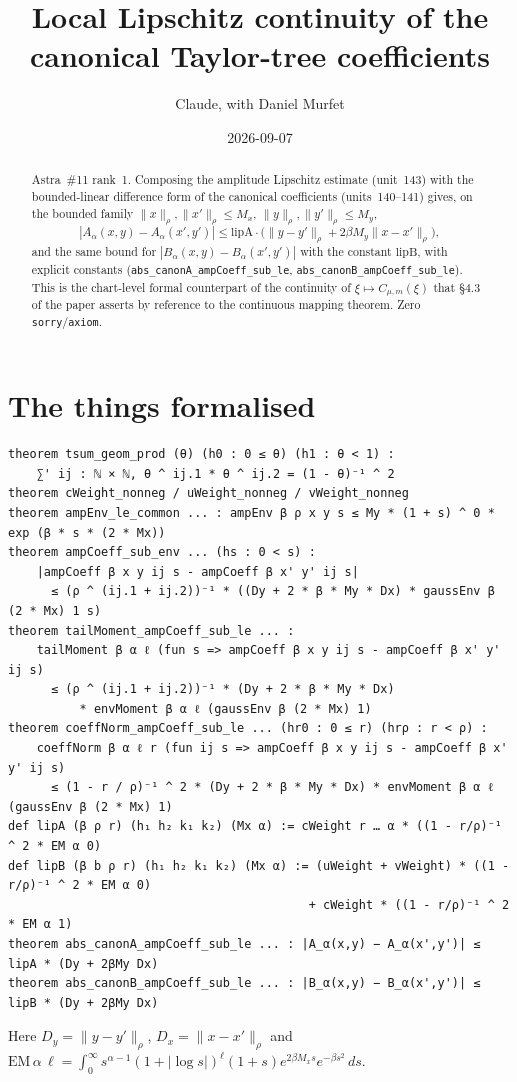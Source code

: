 \documentclass[11pt]{article}
\title{Local Lipschitz continuity of the canonical Taylor-tree coefficients}
\author{Claude, with Daniel Murfet}
\date{2026-09-07}
\begin{document}
\maketitle
\sloppy

\begin{abstract}
Astra~\#11 rank~1. Composing the amplitude Lipschitz estimate (unit~143) with the bounded-linear
difference form of the canonical coefficients (units~140--141) gives, on the bounded family
$\|x\|_\rho,\|x'\|_\rho\le M_x$, $\|y\|_\rho,\|y'\|_\rho\le M_y$,
\[
|A_\alpha(x,y)-A_\alpha(x',y')|\le \mathrm{lipA}\cdot\big(\|y-y'\|_\rho+2\beta M_y\|x-x'\|_\rho\big),
\]
and the same bound for $|B_\alpha(x,y)-B_\alpha(x',y')|$ with the constant $\mathrm{lipB}$,
with explicit constants (\texttt{abs\_canonA\_ampCoeff\_sub\_le}, \texttt{abs\_canonB\_ampCoeff\_sub\_le}).
This is the chart-level formal counterpart of the continuity of $\xi\mapsto C_{\mu,m}(\xi)$ that
§4.3 of the paper asserts by reference to the continuous mapping theorem. Zero
\texttt{sorry}/\texttt{axiom}.
\end{abstract}

\section{The things formalised}
{\small
\begin{verbatim}
theorem tsum_geom_prod (θ) (h0 : 0 ≤ θ) (h1 : θ < 1) :
    ∑' ij : ℕ × ℕ, θ ^ ij.1 * θ ^ ij.2 = (1 - θ)⁻¹ ^ 2
theorem cWeight_nonneg / uWeight_nonneg / vWeight_nonneg
theorem ampEnv_le_common ... : ampEnv β ρ x y s ≤ My * (1 + s) ^ 0 * exp (β * s * (2 * Mx))
theorem ampCoeff_sub_env ... (hs : 0 < s) :
    |ampCoeff β x y ij s - ampCoeff β x' y' ij s|
      ≤ (ρ ^ (ij.1 + ij.2))⁻¹ * ((Dy + 2 * β * My * Dx) * gaussEnv β (2 * Mx) 1 s)
theorem tailMoment_ampCoeff_sub_le ... :
    tailMoment β α ℓ (fun s => ampCoeff β x y ij s - ampCoeff β x' y' ij s)
      ≤ (ρ ^ (ij.1 + ij.2))⁻¹ * (Dy + 2 * β * My * Dx)
          * envMoment β α ℓ (gaussEnv β (2 * Mx) 1)
theorem coeffNorm_ampCoeff_sub_le ... (hr0 : 0 ≤ r) (hrρ : r < ρ) :
    coeffNorm β α ℓ r (fun ij s => ampCoeff β x y ij s - ampCoeff β x' y' ij s)
      ≤ (1 - r / ρ)⁻¹ ^ 2 * (Dy + 2 * β * My * Dx) * envMoment β α ℓ (gaussEnv β (2 * Mx) 1)
def lipA (β ρ r) (h₁ h₂ k₁ k₂) (Mx α) := cWeight r … α * ((1 - r/ρ)⁻¹ ^ 2 * EM α 0)
def lipB (β b ρ r) (h₁ h₂ k₁ k₂) (Mx α) := (uWeight + vWeight) * ((1 - r/ρ)⁻¹ ^ 2 * EM α 0)
                                          + cWeight * ((1 - r/ρ)⁻¹ ^ 2 * EM α 1)
theorem abs_canonA_ampCoeff_sub_le ... : |A_α(x,y) − A_α(x',y')| ≤ lipA * (Dy + 2βMy Dx)
theorem abs_canonB_ampCoeff_sub_le ... : |B_α(x,y) − B_α(x',y')| ≤ lipB * (Dy + 2βMy Dx)
\end{verbatim}
}
Here $D_y=\|y-y'\|_\rho$, $D_x=\|x-x'\|_\rho$ and $\mathrm{EM}\,\alpha\,\ell=\int_0^\infty
s^{\alpha-1}(1+|\log s|)^\ell(1+s)e^{2\beta M_xs}e^{-\beta s^2}\,ds$.
\end{document}
